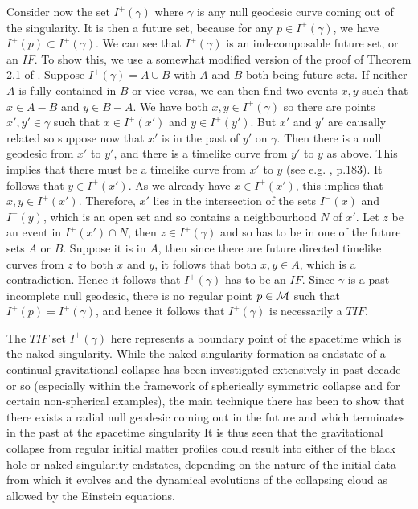 \documentclass[twocolumn,aps,amsmath,amssymb,prl,showpacs,preprintnumbers]
{revtex4}
\newcommand{\M}{\ensuremath{{\cal M}}}
\begin{document}
Consider now the set $I^{+}(\gamma)$ where $\gamma$ is 
any null geodesic curve coming out of the singularity. It is 
then a future set, because for any $p \in I^{+}(\gamma)$, 
we have $I^{+}(p) \subset I^{+}(\gamma)$. We can see that 
$I^{+}(\gamma)$ is an indecomposable future set, or an $IF$. 
To show this, we use a somewhat modified version of 
the proof of Theorem 2.1 of
\cite{geroch}.
Suppose $I^{+}(\gamma) = A \cup B$ with $A$ and $B$ both 
being future sets. If neither $A$ is fully contained in $B$ or 
vice-versa, we can then find two events $x, y$ such that 
$x \in A-B$ and 
$y \in B-A$.  We have both $x,y \in I^{+}(\gamma)$ so there 
are points $x',y' \in \gamma$ such that $x \in  I^{+}(x')$ and
$y \in  I^{+}(y')$. But $x'$ and $y'$ are causally related so
suppose now that $x'$ is in the past of $y'$ on $\gamma$. 
Then there is a null geodesic from $x'$ to $y'$, and there is a 
timelike
curve from $y'$ to $y$ as above. This implies that there must
be a timelike curve from $x'$ to $y$ (see e.g.
\cite{HE}, 
p.183). It follows that $y \in I^+(x')$. As we already have
$x \in I^+(x')$, this implies that $x, y \in I^+(x')$.
Therefore, $x'$ lies in the intersection of the sets $I^-(x)$
and $I^-(y)$, which is an open set and so contains a neighbourhood $N$
of $x'$. Let $z$ be an event in $I^+(x') \cap N$, then 
$z \in I^+(\gamma)$ and so has to be in one of the future sets 
$A$ or $B$. Suppose it is in $A$, then since there are future 
directed timelike curves from $z$ to both $x$ and $y$, it follows
that both $x, y \in A$, which is a contradiction.
Hence it follows that $I^{+}(\gamma)$ has to be an $IF$. Since $\gamma$ 
is a past-incomplete null geodesic, there is no regular point 
$p \in \M$ such that $ I^{+}(p) =  I^{+}(\gamma)$, and hence  
it follows that $I^{+}(\gamma)$ is necessarily a $TIF$.


The $TIF$ set $I^{+}(\gamma)$ here represents a boundary 
point of the spacetime which is the naked singularity. While 
the naked singularity formation as endstate of a continual 
gravitational collapse has been investigated extensively in past 
decade or so (especially 
within the framework of spherically symmetric collapse and for 
certain non-spherical examples), the main technique there has 
been to show that there exists a radial null geodesic coming out 
in the future and which terminates in the past at the 
spacetime singularity 
\cite{rev} 
It is thus seen that the gravitational collapse from 
regular initial matter profiles could result into either of the 
black hole or naked singularity endstates, depending on the nature of 
the initial data from which it evolves and the dynamical evolutions 
of the collapsing cloud as allowed by the Einstein equations.
\end{document}
